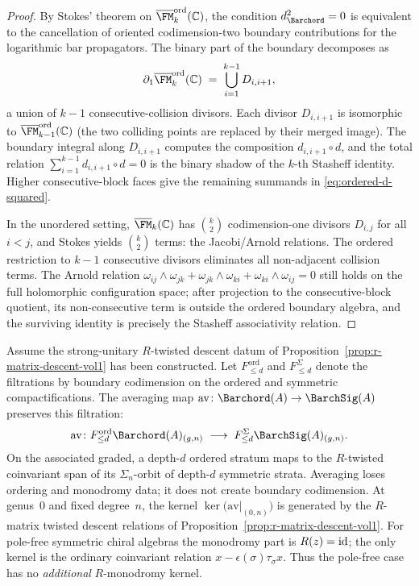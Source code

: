 \begin{proof}
By Stokes' theorem on
$\overline{\FM}_k^{\mathrm{ord}}(\mathbb{C})$, the condition
$d_{\Barchord}^2 = 0$ is equivalent to the cancellation of oriented
codimension-two boundary contributions for the logarithmic bar
propagators. The binary part of the boundary decomposes as
\[
\partial_1\overline{\FM}_k^{\mathrm{ord}}(\mathbb{C})
\;=\;
\bigcup_{i=1}^{k-1} D_{i,i+1},
\]
a union of $k{-}1$ consecutive-collision divisors. Each divisor
$D_{i,i+1}$ is isomorphic to
$\overline{\FM}_{k-1}^{\mathrm{ord}}(\mathbb{C})$
(the two colliding points are replaced by their merged image).
The boundary integral along $D_{i,i+1}$ computes the composition
$d_{i,i+1} \circ d$, and the total relation
$\sum_{i=1}^{k-1} d_{i,i+1} \circ d = 0$
is the binary shadow of the $k$-th Stasheff identity. Higher
consecutive-block faces give the remaining summands in
\eqref{eq:ordered-d-squared}.

In the unordered setting, $\overline{\FM}_k(\mathbb{C})$ has
$\binom{k}{2}$ codimension-one divisors $D_{i,j}$ for all
$i < j$, and Stokes yields $\binom{k}{2}$ terms:
the Jacobi/Arnold relations. The ordered restriction to
$k{-}1$ consecutive divisors eliminates all non-adjacent
collision terms. The Arnold relation
$\omega_{ij} \wedge \omega_{jk} + \omega_{jk} \wedge \omega_{ki}
+ \omega_{ki} \wedge \omega_{ij} = 0$
still holds on the full holomorphic configuration space; after
projection to the consecutive-block quotient, its non-consecutive term
is outside the ordered boundary algebra, and the surviving identity is
precisely the Stasheff associativity relation.
\end{proof}

\begin{proposition}
\ClaimStatusProvedHere
\label{prop:averaging-surplus}
Assume the strong-unitary $R$-twisted descent datum of
Proposition~\ref{prop:r-matrix-descent-vol1} has been constructed. Let
$F_{\leq d}^{\mathrm{ord}}$ and $F_{\leq d}^{\Sigma}$ denote the
filtrations by boundary codimension on the ordered and symmetric
compactifications. The averaging map
$\mathrm{av}\colon\Barchord(A) \to \BarchSig(A)$ preserves this
filtration:
\[
\mathrm{av}\colon
F_{\leq d}^{\mathrm{ord}}\Barchord(A)_{(g,n)}
\;\longrightarrow\;
F_{\leq d}^{\Sigma}\BarchSig(A)_{(g,n)}.
\]
On the associated graded, a depth-$d$ ordered stratum maps to the
$R$-twisted coinvariant span of its $\Sigma_n$-orbit of depth-$d$
symmetric strata. Averaging loses ordering and monodromy data; it does
not create boundary codimension. At genus~$0$ and fixed
degree~$n$, the kernel
$\ker\bigl(\mathrm{av}|_{(0,n)}\bigr)$ is generated by the $R$-matrix
twisted descent relations of
Proposition~\textup{\ref{prop:r-matrix-descent-vol1}}.
For pole-free symmetric chiral algebras the monodromy part is
$R(z)=\mathrm{id}$; the only kernel is the ordinary coinvariant relation
$x-\epsilon(\sigma)\tau_\sigma x$. Thus the pole-free case has no
\emph{additional} $R$-monodromy kernel.
\end{proposition}

